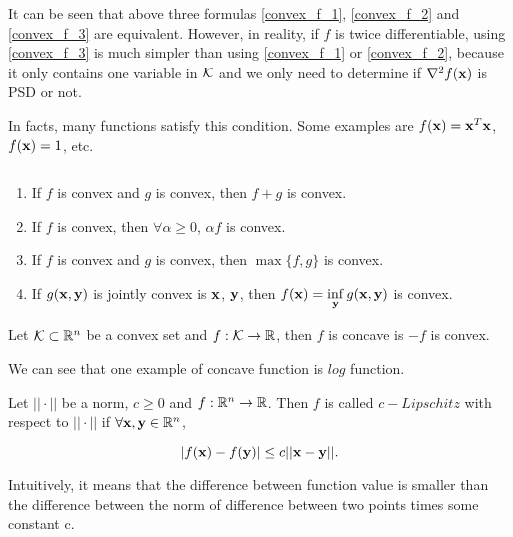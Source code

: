 \documentclass[../main.tex]{subfiles}
\begin{document}
\begin{remark}
	 It can be seen that above three formulas \eqref{convex_f_1}, \eqref{convex_f_2} and \eqref{convex_f_3} are equivalent. However, in reality, if $f$ is twice differentiable, using \eqref{convex_f_3} is much simpler than using \eqref{convex_f_1} or \eqref{convex_f_2}, because it only contains one variable in $\mathcal{K}$ and we only need to determine if $\nabla^2f(\mathbf{x})$ is PSD or not.
	 
	   In facts, many functions satisfy this condition. Some examples are $f(\mathbf{x}) = \mathbf{x}^T \mathbf{x}$, $f(\mathbf{x}) = 1$, etc.
\end{remark}


\begin{proposition} $\quad$ 
	\begin{enumerate}
		\item If $f$ is convex and $g$ is convex, then $f + g$ is convex.
		\item If $f$ is convex, then $\forall \alpha \geq 0 $, $\alpha f$ is convex.
		\item If $f$ is convex and $g$ is convex, then $\max\{f,g\}$ is convex.
		\item If $g(\mathbf{x}, \mathbf{y})$ is jointly convex is $\mathbf{x}$, $\mathbf{y}$, then $f(\mathbf{x}) = \inf\limits_{\mathbf{y}} g(\mathbf{x}, \mathbf{y})$ is convex.
	\end{enumerate}
\end{proposition}

\begin{definition}
	Let $\mathcal{K} \subset  \mathbb{R}^n $ be a convex set and $f:\mathcal{K} \to \mathbb{R}$, then $f$ is concave is $-f$ is convex.
\end{definition}

We can see that one example of concave function is $log$ function.


\begin{definition}[Lipschitz]
	Let $||\cdot||$ be a norm, $c \geq 0$ and $f:\mathbb{R}^n \to \mathbb{R}$. Then $f$ is called $c-Lipschitz$ with respect to $||\cdot||$ if $\forall \mathbf{x}, \mathbf{y} \in \mathbb{R}^n$, 
	
	\begin{equation}
		|f(\mathbf{x}) - f(\mathbf{y})| \leq c||\mathbf{x} - \mathbf{y}||.
	\end{equation}
	
	Intuitively, it means that the difference between function value is smaller than the difference between the norm of difference between two points times some constant c.
\end{definition}
\end{document}
